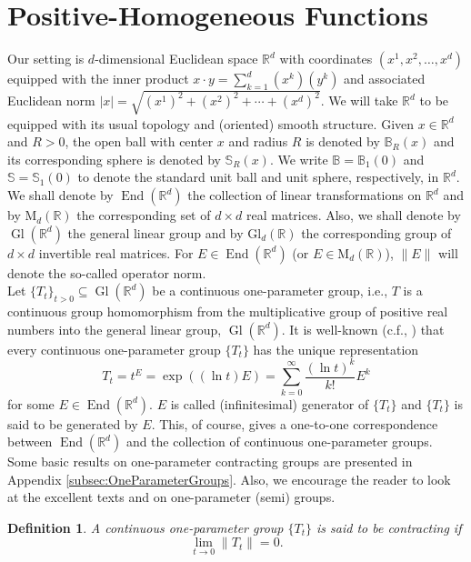 \documentclass[11pt]{article}
\newtheorem{definition}[theorem]{Definition}
\newcommand\MdR{\mbox{M}_d(\mathbb{R})} %
\newcommand\End{\operatorname{End}} %
\newcommand\GldR{\mbox{Gl}_d(\mathbb{R})}%
\newcommand\Gl{\operatorname{Gl}} %
\begin{document}
\section{Positive-Homogeneous Functions}

Our setting is $d$-dimensional Euclidean space $\mathbb{R}^d$ with coordinates $(x^1,x^2,\dots,x^d)$ equipped with the inner product $x\cdot y=\sum_{k=1}^d(x^k)(y^k)$ and associated Euclidean norm $|x|=\sqrt{(x^1)^2+(x^2)^2+\cdots+(x^d)^2}$. We will take $\mathbb{R}^d$ to be equipped with its usual topology and (oriented) smooth structure. Given $x\in\mathbb{R}^d$ and $R>0$, the open ball with center $x$ and radius $R$ is denoted by $\mathbb{B}_R(x)$ and its corresponding sphere is denoted by $\mathbb{S}_R(x)$. We write $\mathbb{B}=\mathbb{B}_1(0)$ and $\mathbb{S}=\mathbb{S}_1(0)$ to denote the standard unit ball and unit sphere, respectively, in $\mathbb{R}^d$. We shall denote by $\End(\mathbb{R}^d)$ the collection of linear transformations on $\mathbb{R}^d$ and by $\MdR$ the corresponding set of $d\times d$ real matrices. Also, we shall denote by $\Gl(\mathbb{R}^d)$ the general linear group and by $\GldR$ the corresponding group of $d\times d$ invertible real matrices. For $E\in \End(\mathbb{R}^d)$ (or $E\in\MdR$), $\|E\|$ will denote the so-called operator norm.\\

\noindent Let $\{T_t\}_{t>0}\subseteq \Gl(\mathbb{R}^d)$ be a continuous one-parameter group, i.e., $T$ is a continuous group homomorphism from the multiplicative group of positive real numbers into the general linear group, $\Gl(\mathbb{R}^d)$. It is well-known (c.f., \cite{Randles2017,Engel2000,Engel2005}) that every continuous one-parameter group $\{T_t\}$ has the unique representation
\begin{equation*}
T_t=t^E=\exp((\ln t) E)=\sum_{k=0}^\infty \frac{(\ln t)^k}{k!}E^k
\end{equation*}
for some $E\in\End(\mathbb{R}^d)$. $E$ is called (infinitesimal) generator of $\{T_t\}$ and $\{T_t\}$ is said to be generated by $E$. This, of course, gives a one-to-one correspondence between $\End(\mathbb{R}^d)$ and the collection of continuous one-parameter groups. Some basic results on one-parameter contracting groups are presented in Appendix \ref{subsec:OneParameterGroups}. Also, we encourage the reader to look at the excellent texts \cite{Engel2005} and \cite{Engel2000} on one-parameter (semi) groups.

\begin{definition} A continuous one-parameter group $\{T_t\}$ is said to be \textit{contracting} if
\begin{equation*}
\lim_{t\to 0}\|T_t\|=0. 
\end{equation*}
\end{definition}
\end{document}
